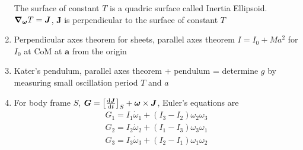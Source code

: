 \documentclass{article}
\theoremstyle{remark}
\theoremstyle{remark}
\begin{document}
\begin{enumerate}
    The surface of constant $T$ is a quadric surface called Inertia Ellipsoid. $\grad_{\bm{\omega}}T=\bm{J}$, $\bm{J}$ is perpendicular to the surface of constant $T$

    \item Perpendicular axes theorem for sheets, parallel axes theorem $I=I_0+Ma^2$ for $I_0$ at CoM at $\bm{a}$ from the origin
    \item Kater's pendulum, parallel axes theorem + pendulum = determine $g$ by measuring small oscillation period $T$ and $a$
    \item For body frame $S$, $\bm{G}=\left[\dv{\bm{J}}{t}\right]_S+\bm{\omega}\times\bm{J}$, Euler's equations are \begin{align*}
        G_1 = I_1\dot\omega_1 + (I_3-I_2)\omega_2\omega_3\\
        G_2 = I_2\dot\omega_2 + (I_1-I_3)\omega_3\omega_1\\
        G_3 = I_3\dot\omega_3 + (I_2-I_1)\omega_1\omega_2
    \end{align*}
    

\end{enumerate}
\end{document}
